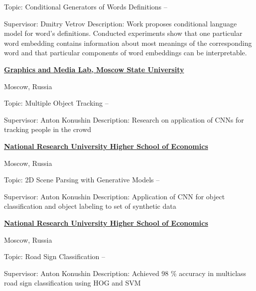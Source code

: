 \documentclass[letterpaper,MMMyyyy,nonstopmode]{simpleresumecv}
\begin{document}
\begin{Body}
\Gap
\BulletItem
Topic: Conditional Generators of Words Definitions
\hfill
{} --
\begin{Detail}
\SubBulletItem
Supervisor:
Dmitry Vetrov
\SubBulletItem
Description:
Work proposes conditional language model for word’s definitions. \newline
Conducted experiments show that one particular word embedding contains \newline
information about most meanings of the corresponding word and that \newline
particular components of word embeddings can be interpretable.
\end{Detail}

\Entry
\href{http://graphics.cs.msu.ru/en}
{\textbf{Graphics and Media Lab, Moscow State University}}
\par
Moscow, Russia

\Gap
\BulletItem
Topic: Multiple Object Tracking
\hfill
{} --
\begin{Detail}
\SubBulletItem
Supervisor:
Anton Konushin
\SubBulletItem
Description:
Research on application of CNNs for tracking people in the crowd
\end{Detail}

\Gap

\Entry
\href{https://www.hse.ru/en/}
{\textbf{National Research University Higher School of Economics}}
\par
Moscow, Russia

\Gap
\BulletItem
Topic: 2D Scene Parsing with Generative Models
\hfill
{} --
\begin{Detail}
\SubBulletItem
Supervisor:
Anton Konushin
\SubBulletItem
Description:
Application of CNN for object classification and object labeling to \newline
set of synthetic data
\end{Detail}

\Gap

\Entry
\href{https://www.hse.ru/en/}
{\textbf{National Research University Higher School of Economics}}
\par
Moscow, Russia

\Gap
\BulletItem
Topic: Road Sign Classification
\hfill
{} --
\begin{Detail}
\SubBulletItem
Supervisor:
Anton Konushin
\SubBulletItem
Description:
Achieved 98 \% accuracy in multiclass road sign classification \newline
using HOG and SVM
\end{Detail}



\end{Body}
\end{document}
